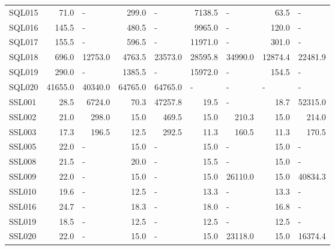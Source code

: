\documentclass[lettersize,journal]{IEEEtran}
\begin{document}
\begin{table}[t!]
{\begin{tabular}{lrrrrrrrr}
			SQL015 & 71.0  & \multicolumn{1}{l}{-} & 299.0  & \multicolumn{1}{l}{-} & 7138.5  & \multicolumn{1}{l}{-} & 63.5  & \multicolumn{1}{l}{-} \\
			SQL016 & 145.5  & \multicolumn{1}{l}{-} & 480.5  & \multicolumn{1}{l}{-} & 9965.0  & \multicolumn{1}{l}{-} & 120.0  & \multicolumn{1}{l}{-} \\
			SQL017 & 155.5  & \multicolumn{1}{l}{-} & 596.5  & \multicolumn{1}{l}{-} & 11971.0  & \multicolumn{1}{l}{-} & 301.0  & \multicolumn{1}{l}{-} \\
			SQL018 & 696.0  & 12753.0  & 4763.5  & 23573.0  & 28595.8  & 34990.0  & 12874.4  & 22481.9  \\
			SQL019 & 290.0  & \multicolumn{1}{l}{-} & 1385.5  & \multicolumn{1}{l}{-} & 15972.0  & \multicolumn{1}{l}{-} & 154.5  & \multicolumn{1}{l}{-} \\
			SQL020 & 41655.0  & 40340.0  & 64765.0  & 64765.0  & \multicolumn{1}{l}{-} & \multicolumn{1}{l}{-} & \multicolumn{1}{l}{-} & \multicolumn{1}{l}{-} \\
			\midrule
			SSL001 & 28.5  & 6724.0  & 70.3  & 47257.8  & 19.5  & \multicolumn{1}{l}{-} & 18.7  & 52315.0  \\
			SSL002 & 21.0  & 298.0  & 15.0  & 469.5  & 15.0  & 210.3  & 15.0  & 214.0  \\
			SSL003 & 17.3  & 196.5  & 12.5  & 292.5  & 11.3  & 160.5  & 11.3  & 170.5  \\
			SSL005 & 22.0  & \multicolumn{1}{l}{-} & 15.0  & \multicolumn{1}{l}{-} & 15.0  & \multicolumn{1}{l}{-} & 15.0  & \multicolumn{1}{l}{-} \\
			SSL008 & 21.5  & \multicolumn{1}{l}{-} & 20.0  & \multicolumn{1}{l}{-} & 15.5  & \multicolumn{1}{l}{-} & 15.0  & \multicolumn{1}{l}{-} \\
			SSL009 & 22.0  & \multicolumn{1}{l}{-} & 15.0  & \multicolumn{1}{l}{-} & 15.0  & 26110.0  & 15.0  & 40834.3  \\
			SSL010 & 19.6  & \multicolumn{1}{l}{-} & 12.5  & \multicolumn{1}{l}{-} & 13.3  & \multicolumn{1}{l}{-} & 13.3  & \multicolumn{1}{l}{-} \\
			SSL016 & 24.7  & \multicolumn{1}{l}{-} & 18.3  & \multicolumn{1}{l}{-} & 18.0  & \multicolumn{1}{l}{-} & 16.8  & \multicolumn{1}{l}{-} \\
			SSL019 & 18.5  & \multicolumn{1}{l}{-} & 12.5  & \multicolumn{1}{l}{-} & 12.5  & \multicolumn{1}{l}{-} & 12.5  & \multicolumn{1}{l}{-} \\
			SSL020 & 22.0  & \multicolumn{1}{l}{-} & 15.0  & \multicolumn{1}{l}{-} & 15.0  & 23118.0  & 15.0  & 16374.4  \\

\end{tabular}}
\end{table}
\end{document}
